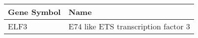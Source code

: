 \begin{tabular}{ll}
\toprule
Gene Symbol &                                Name \\
\midrule
       ELF3 & E74 like ETS transcription factor 3 \\
\bottomrule
\end{tabular}
